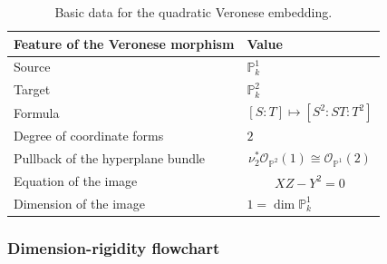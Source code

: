 \documentclass[12pt,a4paper]{article}
\newcommand{\OO}{\mathcal{O}}
\providecommand{\Pj}{\mathbb P}
\theoremstyle{notespace}
\begin{document}
\begin{table}[htbp]
	\centering
	\renewcommand{\arraystretch}{1.4}
	\begin{tabular}{|p{6.5cm}|p{7.2cm}|}
		\hline
		\textbf{Feature of the Veronese morphism}
		&
		\textbf{Value}
		\\
		\hline
		Source
		&
		\(\Pj^1_k\)
		\\
		\hline
		Target
		&
		\(\Pj^2_k\)
		\\
		\hline
		Formula
		&
		\[
		[S:T]\longmapsto[S^2:ST:T^2]
		\]
		\\
		\hline
		Degree of coordinate forms
		&
		\(2\)
		\\
		\hline
		Pullback of the hyperplane bundle
		&
		\[
		\nu_2^*\OO_{\Pj^2}(1)\cong\OO_{\Pj^1}(2)
		\]
		\\
		\hline
		Equation of the image
		&
		\[
		XZ-Y^2=0
		\]
		\\
		\hline
		Dimension of the image
		&
		\(1=\dim\Pj^1_k\)
		\\
		\hline
	\end{tabular}
	\caption{Basic data for the quadratic Veronese embedding.}
\end{table}

\subsubsection{Dimension-rigidity flowchart}
\end{document}

